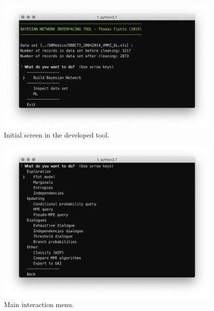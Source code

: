 \begin{figure}[htbp]
\centerline{\includegraphics[width=\columnwidth]{results/images/sw_0}}
\caption{Initial screen in the developed tool.}
\label{fig:sw_0}
\end{figure}

\begin{figure}[htbp]
\centerline{\includegraphics[width=\columnwidth]{results/images/sw_1}}
\caption{Main interaction menu.}
\label{fig:sw_1}
\end{figure}

